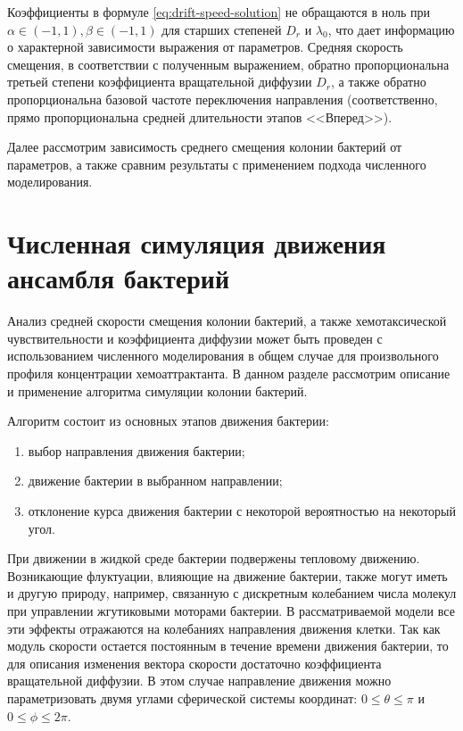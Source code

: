 Коэффициенты в формуле \cref{eq:drift-speed-solution} не обращаются в ноль при $\alpha \in (-1, 1), \beta \in (-1, 1)$ для старших степеней $D_r$ и $\lambda_0$, что дает информацию о характерной зависимости выражения от параметров. Средняя скорость смещения, в соответствии с полученным выражением, обратно пропорциональна третьей степени коэффициента вращательной диффузии $D_r$, а также обратно пропорциональна базовой частоте переключения направления (соответственно, прямо пропорциональна средней длительности этапов <<Вперед>>). 

Далее рассмотрим зависимость среднего смещения колонии бактерий от параметров, а также сравним результаты с применением подхода численного моделирования.

\section{Численная симуляция движения ансамбля бактерий}\label{sec:ch2/sec4}

Анализ средней скорости смещения колонии бактерий, а также хемотаксической чувствительности и коэффициента диффузии может быть проведен с использованием численного моделирования в общем случае для произвольного профиля концентрации хемоаттрактанта. В данном разделе рассмотрим описание и применение алгоритма симуляции колонии бактерий.

Алгоритм состоит из основных этапов движения бактерии: 
\begin{enumerate}
    \item выбор направления движения бактерии;
    \item движение бактерии в выбранном направлении;
    \item отклонение курса движения бактерии с некоторой вероятностью на некоторый угол.
\end{enumerate}

При движении в жидкой среде бактерии подвержены тепловому движению. Возникающие флуктуации, влияющие на движение бактерии, также могут иметь и другую природу, например, связанную с дискретным колебанием числа молекул при управлении жгутиковыми моторами бактерии. В рассматриваемой модели все эти эффекты отражаются на колебаниях направления движения клетки. Так как модуль скорости остается постоянным в течение времени движения бактерии, то для описания изменения вектора скорости достаточно коэффициента вращательной диффузии. В этом случае направление движения можно параметризовать двумя углами сферической системы координат: $0 \leq \theta \leq \pi$ и $0 \leq \phi \leq 2\pi$. 

